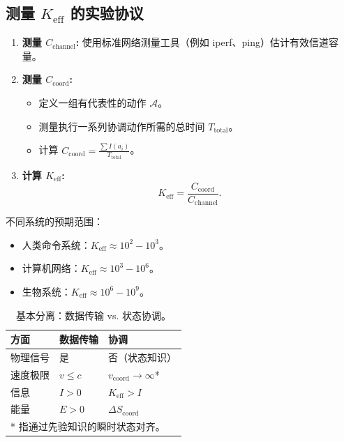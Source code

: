 \documentclass[12pt]{article}
\begin{document}
	\subsection{测量 $K_{\mathrm{eff}}$ 的实验协议}
	\label{app:experiment}
	
	\begin{enumerate}
		\item \textbf{测量 $C_{\text{channel}}$:} 使用标准网络测量工具（例如 iperf、ping）估计有效信道容量。
		
		\item \textbf{测量 $C_{\text{coord}}$:}
		\begin{itemize}
			\item 定义一组有代表性的动作 $\mathcal{A}$。
			\item 测量执行一系列协调动作所需的总时间 $T_{\text{total}}$。
			\item 计算 $C_{\text{coord}} = \frac{\sum I(a_i)}{T_{\text{total}}}$。
		\end{itemize}
		
		\item \textbf{计算 $K_{\mathrm{eff}}$:}
		\[
		K_{\mathrm{eff}} = \frac{C_{\text{coord}}}{C_{\text{channel}}}.
		\]
	\end{enumerate}
	
	不同系统的预期范围：
	\begin{itemize}
		\item 人类命令系统：$K_{\mathrm{eff}} \approx 10^2 - 10^3$。
		\item 计算机网络：$K_{\mathrm{eff}} \approx 10^3 - 10^6$。
		\item 生物系统：$K_{\mathrm{eff}} \approx 10^6 - 10^9$。
	\end{itemize}
	
	\begin{table}[htbp]
		\centering
		\caption{基本分离：数据传输 vs. 状态协调。}
		\label{tab:separation}
		\begin{tabular}{lp{6cm}p{6cm}}
			\toprule
			\textbf{方面} & \textbf{数据传输} & \textbf{协调} \\
			\midrule
			物理信号 & 是 & 否（状态知识） \\
			速度极限 & $v \leq c$ & $v_{\text{coord}} \to \infty$* \\
			信息 & $I > 0$ & $K_{\text{eff}} > I$ \\
			能量 & $E > 0$ & $\Delta S_{\text{coord}}$ \\
			\bottomrule
			\multicolumn{3}{l}{* 指通过先验知识的瞬时状态对齐。}
		\end{tabular}
	\end{table}
	
\end{document}
